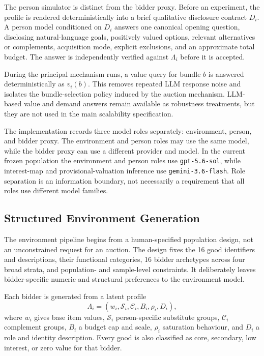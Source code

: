 The person simulator is distinct from the bidder proxy. Before an experiment,
the profile is rendered deterministically into a brief qualitative disclosure
contract \(D_i\). A person model conditioned on \(D_i\) answers one canonical
opening question, disclosing natural-language goals, positively valued
options, relevant alternatives or complements, acquisition mode, explicit
exclusions, and an approximate total budget. The answer is independently
verified against \(\Lambda_i\) before it is accepted.

During the principal mechanism runs, a value query for bundle \(b\) is
answered deterministically as \(v_i(b)\). This removes repeated LLM response
noise and isolates the bundle-selection policy induced by the auction
mechanism. LLM-based value and demand answers remain available as robustness
treatments, but they are not used in the main scalability specification.

The implementation records three model roles separately: environment,
person, and bidder proxy. The environment and person roles may use the same
model, while the bidder proxy can use a different provider and model. In the
current frozen population the environment and person roles use
\texttt{gpt-5.6-sol}, while interest-map and provisional-valuation inference
use \texttt{gemini-3.6-flash}. Role separation is an information boundary,
not necessarily a requirement that all roles use different model families.

\subsection{Structured Environment Generation}

The environment pipeline begins from a human-specified population design,
not an unconstrained request for an auction. The design fixes the 16 good
identifiers and descriptions, their functional categories, 16 bidder
archetypes across four broad strata, and population- and sample-level
constraints. It deliberately leaves bidder-specific numeric and structural
preferences to the environment model.

Each bidder is generated from a latent profile
\[
\Lambda_i=(w_i,\mathcal{S}_i,\mathcal{C}_i,B_i,\rho_i,D_i),
\]
where \(w_i\) gives base item values, \(\mathcal{S}_i\) person-specific
substitute groups, \(\mathcal{C}_i\) complement groups, \(B_i\) a budget cap
and scale, \(\rho_i\) saturation behaviour, and \(D_i\) a role and identity
description. Every good is also classified as core, secondary, low interest,
or zero value for that bidder.

